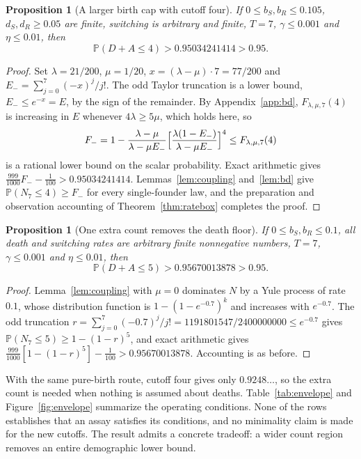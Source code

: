 \documentclass[11pt,a4paper]{article}
\theoremstyle{plain}
\newtheorem{proposition}[theorem]{Proposition}
\theoremstyle{definition}
\theoremstyle{remark}
\newcommand{\PP}{\mathbb P}
\begin{document}
\begin{proposition}[A larger birth cap with cutoff four]\label{prop:broad}
If $0\le b_S,b_R\le0.105$, $d_S,d_R\ge0.05$ are finite, switching is arbitrary and finite, $T=7$, $\gamma\le0.001$ and $\eta\le0.01$, then
\begin{equation}\label{eq:broad}
\PP(D+A\le4)>0.95034241414>0.95 .
\end{equation}
\end{proposition}
\begin{proof}
Set $\lambda=21/200$, $\mu=1/20$, $x=(\lambda-\mu)\cdot7=77/200$ and $E_-=\sum_{j=0}^7(-x)^j/j!$. The odd Taylor truncation is a lower bound, $E_-\le e^{-x}=E$, by the sign of the remainder. By Appendix~\ref{app:bd}, $F_{\lambda,\mu,7}(4)$ is increasing in $E$ whenever $4\lambda\ge5\mu$, which holds here, so
\[
F_-=1-\frac{\lambda-\mu}{\lambda-\mu E_-}\Bigl[\frac{\lambda(1-E_-)}{\lambda-\mu E_-}\Bigr]^4\le F_{\lambda,\mu,7}(4)
\]
is a rational lower bound on the scalar probability. Exact arithmetic gives $\tfrac{999}{1000}F_--\tfrac1{100}>0.95034241414$. Lemmas~\ref{lem:coupling} and~\ref{lem:bd} give $\PP(N_7\le4)\ge F_-$ for every single-founder law, and the preparation and observation accounting of Theorem~\ref{thm:ratebox} completes the proof.
\end{proof}

\begin{proposition}[One extra count removes the death floor]\label{prop:purebirth}
If $0\le b_S,b_R\le0.1$, all death and switching rates are arbitrary finite nonnegative numbers, $T=7$, $\gamma\le0.001$ and $\eta\le0.01$, then
\begin{equation}\label{eq:purebirth}
\PP(D+A\le5)>0.95670013878>0.95 .
\end{equation}
\end{proposition}
\begin{proof}
Lemma~\ref{lem:coupling} with $\mu=0$ dominates $N$ by a Yule process of rate $0.1$, whose distribution function is $1-(1-e^{-0.7})^k$ and increases with $e^{-0.7}$. The odd truncation $r=\sum_{j=0}^7(-0.7)^j/j!=1191801547/2400000000\le e^{-0.7}$ gives $\PP(N_7\le5)\ge1-(1-r)^5$, and exact arithmetic gives $\tfrac{999}{1000}[1-(1-r)^5]-\tfrac1{100}>0.95670013878$. Accounting is as before.
\end{proof}

With the same pure-birth route, cutoff four gives only $0.9248\ldots$, so the extra count is needed when nothing is assumed about deaths. Table~\ref{tab:envelope} and Figure~\ref{fig:envelope} summarize the operating conditions. None of the rows establishes that an assay satisfies its conditions, and no minimality claim is made for the new cutoffs. The result admits a concrete tradeoff: a wider count region removes an entire demographic lower bound.
\end{document}
